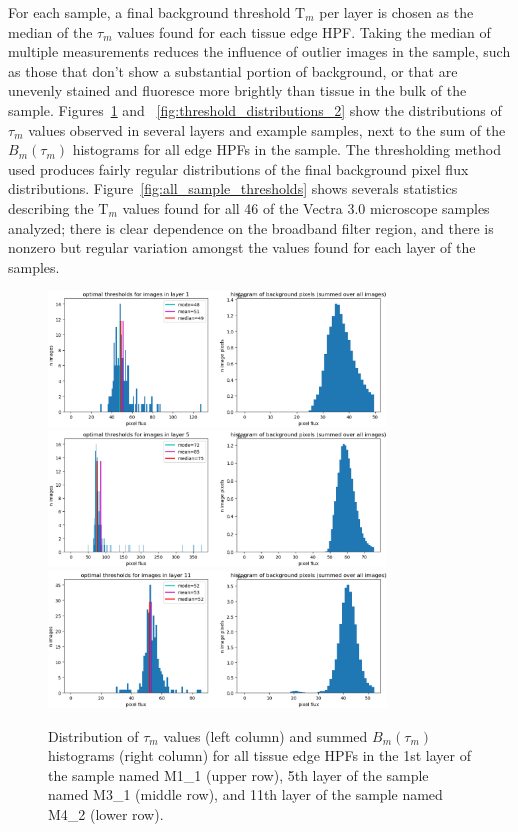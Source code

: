 \documentclass[letterpaper,11pt]{article}
\newcommand{\reffig}[1]{Figure~\ref{#1}}
\newcommand{\Tau}{\mathrm{T}}
\begin{document}
For each sample, a final background threshold $\Tau_{m}$ per layer is chosen as the median of the $\tau_{m}$ values found for each tissue edge HPF. Taking the median of multiple measurements reduces the influence of outlier images in the sample, such as those that don't show a substantial portion of background, or that are unevenly stained and fluoresce more brightly than tissue in the bulk of the sample. Figures~\ref{fig:threshold_distributions_1} and ~\ref{fig:threshold_distributions_2} show the distributions of $\tau_{m}$ values observed in several layers and example samples, next to the sum of the $B_{m}(\tau_{m})$ histograms for all edge HPFs in the sample. The thresholding method used produces fairly regular distributions of the final background pixel flux distributions. \reffig{fig:all_sample_thresholds} shows severals statistics describing the $\Tau_{m}$ values found for all 46 of the Vectra 3.0 microscope samples analyzed; there is clear dependence on the broadband filter region, and there is nonzero but regular variation amongst the values found for each layer of the samples.

\begin{figure}[!ht]
\centering
\includegraphics[width=0.80\textwidth]{images/masking/M1_1_layer_1_background_threshold_plots}
\includegraphics[width=0.80\textwidth]{images/masking/M3_1_layer_5_background_threshold_plots}
\includegraphics[width=0.80\textwidth]{images/masking/M4_2_layer_11_background_threshold_plots}
\caption{\footnotesize Distribution of $\tau_{m}$ values (left column) and summed $B_{m}(\tau_{m})$ histograms (right column) for all tissue edge HPFs in the 1st layer of the sample named M1\_1 (upper row), 5th layer of the sample named M3\_1 (middle row), and 11th layer of the sample named M4\_2 (lower row).}
\label{fig:threshold_distributions_1}
\end{figure}
\end{document}
